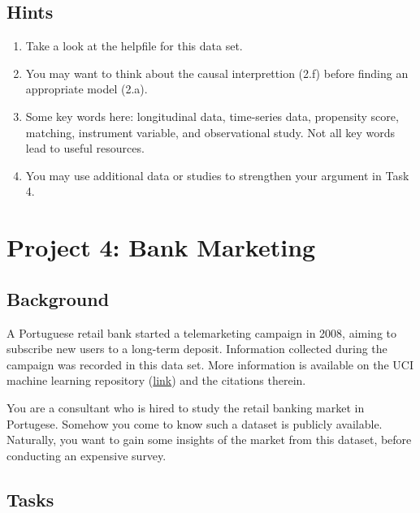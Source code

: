 \documentclass[12pt,]{book}
\providecommand{\tightlist}{%
  \setlength{\itemsep}{0pt}\setlength{\parskip}{0pt}}
\begin{document}
\subsection{Hints}\label{hints}

\begin{enumerate}
\def\labelenumi{\arabic{enumi}.}
\tightlist
\item
  Take a look at the helpfile for this data set.
\item
  You may want to think about the causal interprettion (2.f) before
  finding an appropriate model (2.a).
\item
  Some key words here: longitudinal data, time-series data, propensity
  score, matching, instrument variable, and observational study. Not all
  key words lead to useful resources.
\item
  You may use additional data or studies to strengthen your argument in
  Task 4.
\end{enumerate}

\section{Project 4: Bank Marketing}\label{project-4-bank-marketing}

\subsection{Background}\label{background-3}

A Portuguese retail bank started a telemarketing campaign in 2008,
aiming to subscribe new users to a long-term deposit. Information
collected during the campaign was recorded in this data set. More
information is available on the UCI machine learning repository
(\href{https://archive.ics.uci.edu/ml/datasets/Bank+Marketing\#}{link})
and the citations therein.

You are a consultant who is hired to study the retail banking market in
Portugese. Somehow you come to know such a dataset is publicly
available. Naturally, you want to gain some insights of the market from
this dataset, before conducting an expensive survey.

\subsection{Tasks}\label{tasks-3}
\end{document}
